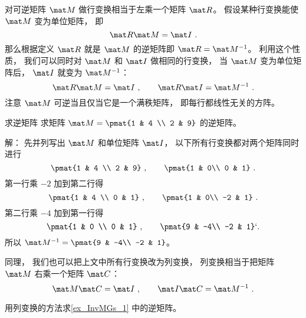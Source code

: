 

对可逆矩阵 $\mat M$ 做行变换相当于左乘一个矩阵 $\mat R$。 假设某种行变换能使 $\mat M$ 变为单位矩阵， 即
\begin{equation}
\mat R \mat M = \mat I~.
\end{equation}
那么根据定义 $\mat R$ 就是 $\mat M$ 的逆矩阵即 $\mat R = \mat M^{-1}$。 利用这个性质， 我们可以同时对 $\mat M$ 和 $\mat I$ 做相同的行变换， 当 $\mat M$ 变为单位矩阵后， $\mat I$ 就变为 $\mat M^{-1}$：
\begin{equation}
\mat R\mat M = \mat I~,
\qquad
\mat R \mat I = \mat M^{-1}~.
\end{equation}
注意 $\mat M$ 可逆当且仅当它是一个满秩矩阵， 即每行都线性无关的方阵。

\begin{example}{求逆矩阵}\label{ex_InvMGs_1}
求矩阵 $\mat M = \pmat{1 & 4 \\ 2 & 9}$ 的逆矩阵。

解： 先并列写出 $\mat M$ 和单位矩阵 $\mat I$， 以下所有行变换都对两个矩阵同时进行
\begin{equation}
\pmat{1 & 4 \\ 2 & 9}~, \qquad \pmat{1 & 0\\ 0 & 1}~.
\end{equation}
第一行乘 $-2$ 加到第二行得
\begin{equation}
\pmat{1 & 4 \\ 0 & 1} ~,\qquad \pmat{1 & 0\\ -2 & 1}~.
\end{equation}
第二行乘 $-4$ 加到第一行得
\begin{equation}
\pmat{1 & 0 \\ 0 & 1} ~,\qquad \pmat{9 & -4\\ -2 & 1}`.
\end{equation}
所以 $\mat M^{-1} = \pmat{9 & -4\\ -2 & 1}$。
\end{example}

同理， 我们也可以把上文中所有行变换改为列变换， 列变换相当于把矩阵 $\mat M$ 右乘一个矩阵 $\mat C$：
\begin{equation}
\mat M\mat C = \mat I~,
\qquad
\mat I\mat C = \mat M^{-1}~.
\end{equation}
\begin{exercise}{}
用列变换的方法求\autoref{ex_InvMGs_1} 中的逆矩阵。
\end{exercise}

